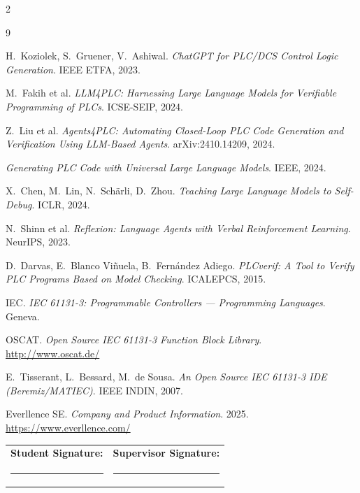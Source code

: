 \documentclass[10pt,a4paper]{article}
\begin{document}
{\footnotesize
\renewcommand{\refname}{}\vspace{-3.2em}
\begin{multicols}{2}
\raggedright
\begin{thebibliography}{9}\itemsep0pt

H.\ Koziolek, S.\ Gruener, V.\ Ashiwal.
\textit{ChatGPT for PLC/DCS Control Logic Generation}. IEEE ETFA, 2023.

M.\ Fakih et al.
\textit{LLM4PLC: Harnessing Large Language Models for Verifiable Programming of PLCs}. ICSE-SEIP, 2024.

Z.\ Liu et al.
\textit{Agents4PLC: Automating Closed-Loop PLC Code Generation and Verification Using LLM-Based Agents}. arXiv:2410.14209, 2024.

\textit{Generating PLC Code with Universal Large Language Models}. IEEE, 2024.

X.\ Chen, M.\ Lin, N.\ Sch\"arli, D.\ Zhou.
\textit{Teaching Large Language Models to Self-Debug}. ICLR, 2024.

N.\ Shinn et al.
\textit{Reflexion: Language Agents with Verbal Reinforcement Learning}. NeurIPS, 2023.

D.\ Darvas, E.\ Blanco Vi\~nuela, B.\ Fern\'andez Adiego.
\textit{PLCverif: A Tool to Verify PLC Programs Based on Model Checking}. ICALEPCS, 2015.

IEC. \textit{IEC 61131-3: Programmable Controllers --- Programming Languages}. Geneva.

OSCAT. \textit{Open Source IEC 61131-3 Function Block Library}. \url{http://www.oscat.de/}

E.\ Tisserant, L.\ Bessard, M.\ de Sousa.
\textit{An Open Source IEC 61131-3 IDE (Beremiz/MATIEC)}. IEEE INDIN, 2007.

Everllence SE. \textit{Company and Product Information}. 2025. \url{https://www.everllence.com/}

\end{thebibliography}
\end{multicols}}

\vspace{0.4em}
\noindent
{\small
\begin{tabularx}{\textwidth}{X X}
\textbf{Student Signature:} & \textbf{Supervisor Signature:} \\[1.4em]
\rule{0.42\textwidth}{0.4pt} & \rule{0.42\textwidth}{0.4pt} \\
\end{tabularx}}
\end{document}
